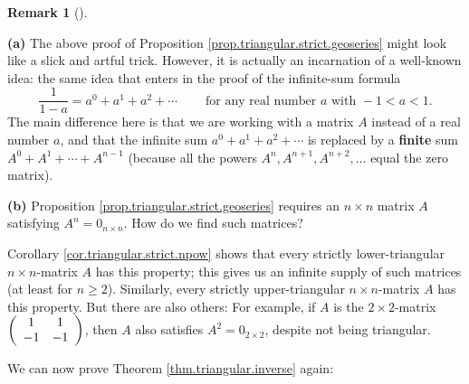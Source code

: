 \documentclass[numbers=enddot,12pt,final,onecolumn,notitlepage]{scrartcl}%
\theoremstyle{definition}
\newtheorem{remk}[theo]{Remark}
\newenvironment{remark}[1][]
{\begin{remk}[#1]\begin{leftbar}}
{\end{leftbar}\end{remk}}
\begin{document}
\begin{remark}
\textbf{(a)} The above proof of Proposition
\ref{prop.triangular.strict.geoseries} might look like a slick and artful
trick. However, it is actually an incarnation of a well-known idea: the same
idea that enters in the proof of the infinite-sum formula%
\[
\dfrac{1}{1-a}=a^{0}+a^{1}+a^{2}+\cdots\ \ \ \ \ \ \ \ \ \ \text{for any real
number }a\text{ with }-1<a<1.
\]
The main difference here is that we are working with a matrix $A$ instead of a
real number $a$, and that the infinite sum $a^{0}+a^{1}+a^{2}+\cdots$ is
replaced by a \textbf{finite} sum $A^{0}+A^{1}+\cdots+A^{n-1}$ (because all
the powers $A^{n},A^{n+1},A^{n+2},\ldots$ equal the zero matrix).

\textbf{(b)} Proposition \ref{prop.triangular.strict.geoseries} requires an
$n\times n$ matrix $A$ satisfying $A^{n}=0_{n\times n}$. How do we find such matrices?

Corollary \ref{cor.triangular.strict.npow} shows that every strictly
lower-triangular $n\times n$-matrix $A$ has this property; this gives us an
infinite supply of such matrices (at least for $n\geq2$). Similarly, every
strictly upper-triangular $n\times n$-matrix $A$ has this property. But there
are also others: For example, if $A$ is the $2\times2$-matrix $\left(
\begin{array}
[c]{cc}%
1 & 1\\
-1 & -1
\end{array}
\right)  $, then $A$ also satisfies $A^{2}=0_{2\times2}$, despite not being triangular.
\end{remark}

We can now prove Theorem \ref{thm.triangular.inverse} again:
\end{document}
